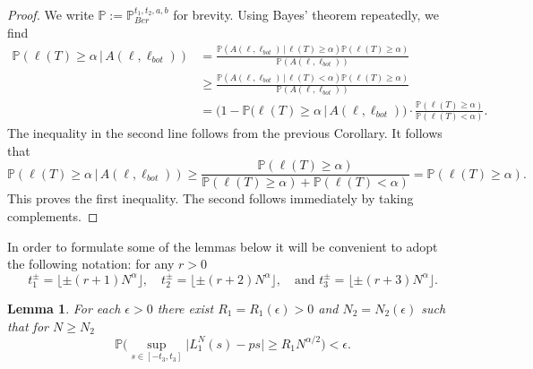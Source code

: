 \documentclass[12pt]{article}
\newtheorem{lemma}{Lemma}
\begin{document}
	\begin{proof}
		We write $\mathbb{P} := \mathbb{P}^{t_1,t_2,a,b}_{Ber}$ for brevity. Using Bayes' theorem repeatedly, we find
		\begin{align*}
		\mathbb{P}(\ell(T)\geq\alpha\,|\,A(\ell,\ell_{bot})) &= \frac{\mathbb{P}(A(\ell,\ell_{bot})\,|\,\ell(T)\geq\alpha) \mathbb{P}(\ell(T)\geq\alpha)}{\mathbb{P}(A(\ell,\ell_{bot}))}\\ 
		&\geq \frac{\mathbb{P}(A(\ell,\ell_{bot})\,|\,\ell(T) < \alpha) \mathbb{P}(\ell(T)\geq\alpha)}{\mathbb{P}(A(\ell,\ell_{bot}))}\\
		&= \big(1 - \mathbb{P}(\ell(T)\geq\alpha\,|\,A(\ell,\ell_{bot})\big)\cdot\frac{\mathbb{P}(\ell(T)\geq\alpha)}{\mathbb{P}(\ell(T) < \alpha)}.
		\end{align*}
		The inequality in the second line follows from the previous Corollary. It follows that
		\[
		\mathbb{P}(\ell(T)\geq\alpha\,|\,A(\ell,\ell_{bot})) \geq \frac{\mathbb{P}(\ell(T)\geq\alpha)}{\mathbb{P}(\ell(T)\geq\alpha) + \mathbb{P}(\ell(T) < \alpha)} = \mathbb{P}(\ell(T)\geq\alpha).
		\]
		This proves the first inequality. The second follows immediately by taking complements.
	\end{proof}

	In order to formulate some of the lemmas below it will be convenient to adopt the following notation: for any $r > 0$
	\begin{equation*}\label{eqsts}
	t^{\pm}_1 =\lfloor \pm (r+1) N^{\alpha} \rfloor,\quad t^{\pm}_2 = \lfloor \pm (r+2)N^{\alpha} \rfloor,\quad \textrm{and } t_3^{\pm} = \lfloor \pm (r+3)N^{\alpha} \rfloor.
	\end{equation*}

	\begin{lemma}
		For each $\epsilon > 0$ there exist $R_1=R_1(\epsilon) > 0$ and $N_2= N_2(\epsilon)$ such that for $N \geq N_2$ 
		$$\mathbb{P}\Big( \sup_{s \in [ -t_3, t_3] }\big| L^N_1(s) - p s \big| \geq  R_1N^{\alpha/2} \Big) < \epsilon.$$
	\end{lemma}
\end{document}
